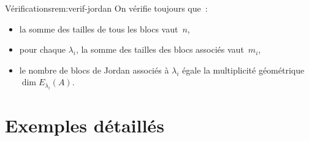 \begin{remark}{Vérifications}{rem:verif-jordan}
  On vérifie toujours que~:
  \begin{itemize}
    \item la somme des tailles de tous les blocs vaut~$n$,
    \item pour chaque $\lambda_i$, la somme des tailles des blocs
      associés vaut~$m_i$,
    \item le nombre de blocs de Jordan associés à $\lambda_i$ égale
      la multiplicité géométrique $\dim E_{\lambda_i}(A)$.
  \end{itemize}
\end{remark}


\section{Exemples détaillés}\label{sec:exemples-jordan}

